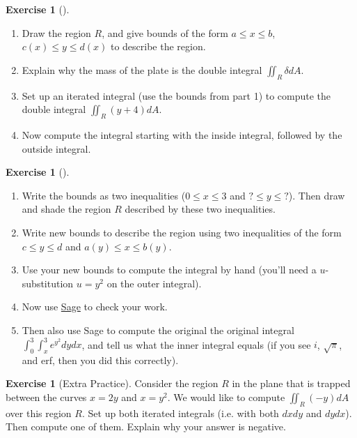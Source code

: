 \documentclass[10pt,]{book}
\theoremstyle{plain}
\theoremstyle{definition}
\theoremstyle{definition}
\theoremstyle{definition}
\theoremstyle{definition}
\newtheorem{exploration}[project]{Exercise}
\theoremstyle{definition}
\numberwithin{equation}{section}
\newcommand{\ds}{\displaystyle}
\begin{document}
\begin{exploration}[]\label{exploration-251}
\leavevmode%
\begin{enumerate}[font=\bfseries,label=(\alph*),ref=\alph*]
\item\label{task-681} Draw the region \(R\), and give bounds of the form \(a\leq x\leq b\), \(c(x)\leq y\leq d(x)\) to describe the region.%
\item\label{task-682} Explain why the mass of the plate is the double integral \(\ds\iint_R \delta dA\).%
\item\label{task-683} Set up an iterated integral (use the bounds from part 1) to compute the double integral \(\ds\iint_R (y+4) dA\).%
\item\label{task-684} Now compute the integral starting with the inside integral, followed by the outside integral.%
\end{enumerate}
\end{exploration}
\begin{exploration}[]\label{exploration-252}
\leavevmode%
\begin{enumerate}[font=\bfseries,label=(\alph*),ref=\alph*]
\item\label{task-685} Write the bounds as two inequalities (\(0\leq x\leq 3\) and \(?\leq y\leq ?\)). Then draw and shade the region \(R\) described by these two inequalities.%
\item\label{task-686} Write new bounds to describe the region using two inequalities of the form \(c\leq y\leq d\) and \(a(y)\leq x\leq b(y)\).%
\item\label{task-687} Use your new bounds to compute the integral by hand (you'll need a \(u\)-substitution \(u=y^2\) on the outer integral).%
\item\label{task-688} Now use \href{http://bmw.byuimath.com/dokuwiki/doku.php?id=double_integral_calculator}{Sage} to check your work.%
\item\label{task-689} Then also use Sage to compute the original the original integral \(\ds \int_0^3\int_x^3 e^{y^2}dydx\), and tell us what the inner integral equals (if you see \(i\), \(\sqrt{\pi}\), and erf, then you did this correctly).%
\end{enumerate}
\end{exploration}
\begin{exploration}[Extra Practice]\label{exploration-253}
Consider the region \(R\) in the plane that is trapped between the curves \(x=2y\) and \(x=y^2\). We would like to compute \(\iint_R (-y) dA\) over this region \(R\). Set up both iterated integrals (i.e. with both \(dxdy\) and \(dydx\)). Then compute one of them. Explain why your answer is negative.%
\end{exploration}
\typeout{************************************************}
\typeout{************************************************}
\end{document}
